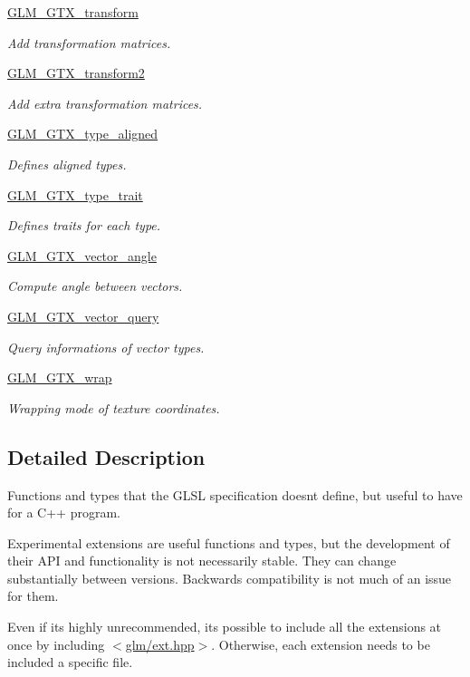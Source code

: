 \begin{DoxyCompactItemize}
\mbox{\hyperlink{group__gtx__transform}{G\+L\+M\+\_\+\+G\+T\+X\+\_\+transform}}
\begin{DoxyCompactList}\small\item\em Add transformation matrices. \end{DoxyCompactList}\item 
\mbox{\hyperlink{group__gtx__transform2}{G\+L\+M\+\_\+\+G\+T\+X\+\_\+transform2}}
\begin{DoxyCompactList}\small\item\em Add extra transformation matrices. \end{DoxyCompactList}\item 
\mbox{\hyperlink{group__gtx__type__aligned}{G\+L\+M\+\_\+\+G\+T\+X\+\_\+type\+\_\+aligned}}
\begin{DoxyCompactList}\small\item\em Defines aligned types. \end{DoxyCompactList}\item 
\mbox{\hyperlink{group__gtx__type__trait}{G\+L\+M\+\_\+\+G\+T\+X\+\_\+type\+\_\+trait}}
\begin{DoxyCompactList}\small\item\em Defines traits for each type. \end{DoxyCompactList}\item 
\mbox{\hyperlink{group__gtx__vector__angle}{G\+L\+M\+\_\+\+G\+T\+X\+\_\+vector\+\_\+angle}}
\begin{DoxyCompactList}\small\item\em Compute angle between vectors. \end{DoxyCompactList}\item 
\mbox{\hyperlink{group__gtx__vector__query}{G\+L\+M\+\_\+\+G\+T\+X\+\_\+vector\+\_\+query}}
\begin{DoxyCompactList}\small\item\em Query informations of vector types. \end{DoxyCompactList}\item 
\mbox{\hyperlink{group__gtx__wrap}{G\+L\+M\+\_\+\+G\+T\+X\+\_\+wrap}}
\begin{DoxyCompactList}\small\item\em Wrapping mode of texture coordinates. \end{DoxyCompactList}\end{DoxyCompactItemize}


\subsection{Detailed Description}
Functions and types that the G\+L\+SL specification doesn\textquotesingle{}t define, but useful to have for a C++ program. 

Experimental extensions are useful functions and types, but the development of their A\+PI and functionality is not necessarily stable. They can change substantially between versions. Backwards compatibility is not much of an issue for them.

Even if it\textquotesingle{}s highly unrecommended, it\textquotesingle{}s possible to include all the extensions at once by including $<$\mbox{\hyperlink{ext_8hpp}{glm/ext.\+hpp}}$>$. Otherwise, each extension needs to be included a specific file. 
